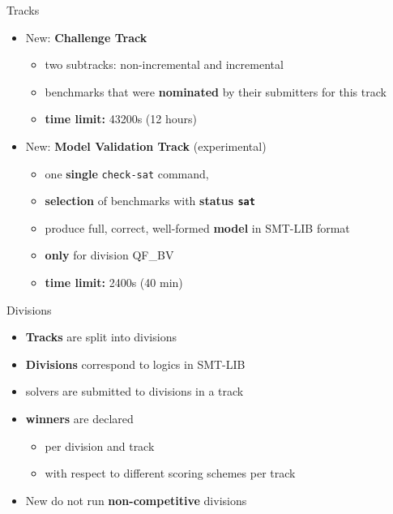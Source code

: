 \documentclass[10pt]{beamer}
\newcommand{\orange}[1]{\textcolor{mLightBrown}{#1}}
\newcommand{\akey}[1]{\texttt{#1}\xspace}
\newcommand{\orangea}{\ensuremath{\textcolor{mLightBrown}{\longrightarrow}}\xspace}
\begin{document}
  \begin{frame}{Tracks}
    \begin{itemize}
      \item \orange{New:} \textbf{Challenge Track}
        \begin{itemize}
          \item two subtracks: \orange{non-incremental} and \orange{incremental}
          \item benchmarks that were \textbf{nominated} by their submitters for
            this track
          \item \textbf{time limit:} 43200s (12 hours)
        \end{itemize}
      \vspace{4ex}
      \item \orange{New:} \textbf{Model Validation Track} (\orange{experimental})
        \begin{itemize}
          \item one \textbf{single} \akey{check-sat} command,
          \item \textbf{selection} of benchmarks with \textbf{status \akey{sat}}
          \item produce full, correct, well-formed
            \textbf{model} in SMT-LIB format
          \item \textbf{only} for division QF\_BV
          \item \textbf{time limit:} 2400s (40 min)
        \end{itemize}
      \end{itemize}
  \end{frame}

  \begin{frame}{Divisions}
    \begin{itemize}
      \setbeamertemplate{itemize items}{\orangea}
      \item \textbf{Tracks} are split into divisions
      \item \textbf{Divisions} correspond to \orange{logics} in SMT-LIB
    \end{itemize}
    \begin{itemize}
      \item solvers are submitted to divisions in a track
      \item \textbf{winners} are declared
        \begin{itemize}
          \item per division and track
          \item with respect to different scoring schemes per track
        \end{itemize}
      \vspace{1ex}
      \item \orange{New} do not run \textbf{non-competitive} divisions
    \end{itemize}
  \end{frame}
\end{document}
